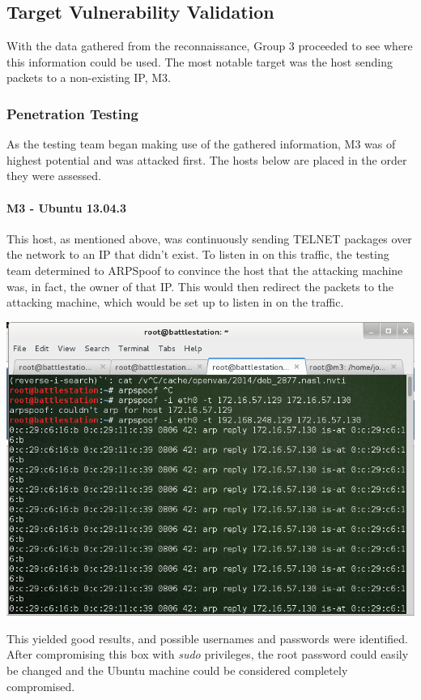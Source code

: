 \subsection{Target Vulnerability Validation}
With the data gathered from the reconnaissance, Group 3 proceeded to see where this information could be used. The most notable target was the host sending packets to a non-existing IP, M3.
  
\subsubsection{Penetration Testing}
As the testing team began making use of the gathered information, M3 was of highest potential and was attacked first. The hosts below are placed in the order they were assessed.

\paragraph{M3 - Ubuntu 13.04.3}
This host, as mentioned above, was continuously sending TELNET packages over the network to an IP that didn't exist. To listen in on this traffic, the testing team determined to ARPSpoof to convince the host that the attacking machine was, in fact, the owner of that IP. This would then redirect the packets to the attacking machine, which would be set up to listen in on the traffic.

\includegraphics[scale=0.5]{arpspoof2.png}


This yielded good results, and possible usernames and passwords were identified. After compromising this box with \textit{sudo} privileges, the root password could easily be changed and the Ubuntu machine could be considered completely compromised. 

